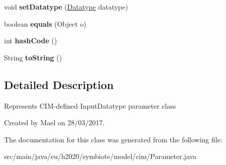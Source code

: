 \begin{DoxyCompactItemize}
\item 
\mbox{\label{classeu_1_1h2020_1_1symbiote_1_1model_1_1cim_1_1Parameter_a3c5a9ca9475289c38acc75461dfe6df3}} 
void {\bfseries set\+Datatype} (\hyperlink{classeu_1_1h2020_1_1symbiote_1_1model_1_1cim_1_1Datatype}{Datatype} datatype)
\item 
\mbox{\label{classeu_1_1h2020_1_1symbiote_1_1model_1_1cim_1_1Parameter_a5aff0a7b77e8376b0f1c7f085a8a1b95}} 
boolean {\bfseries equals} (Object o)
\item 
\mbox{\label{classeu_1_1h2020_1_1symbiote_1_1model_1_1cim_1_1Parameter_a38d4a39788f167c5732983b86d5ab31f}} 
int {\bfseries hash\+Code} ()
\item 
\mbox{\label{classeu_1_1h2020_1_1symbiote_1_1model_1_1cim_1_1Parameter_ac592d6b0e908fc0f1af48cd43c6ce1f9}} 
String {\bfseries to\+String} ()
\end{DoxyCompactItemize}


\subsection{Detailed Description}
Represents C\+I\+M-\/defined Input\+Datatype parameter class

Created by Mael on 28/03/2017. 

The documentation for this class was generated from the following file\+:\begin{DoxyCompactItemize}
\item 
src/main/java/eu/h2020/symbiote/model/cim/Parameter.\+java\end{DoxyCompactItemize}
